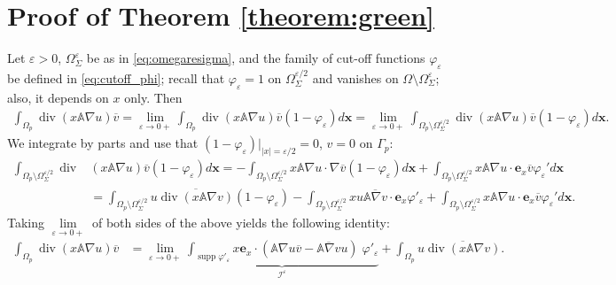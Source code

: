 \documentclass[report]{elsarticle}
\numberwithin{theorem}{section}
\renewcommand{\vec}[1]{\mathbf{#1}}
\newcommand{\re}{\varepsilon}
\begin{document}
\section{Proof of Theorem \ref{theorem:green}}
\label{appendix:green_formula_to_submit}
Let $\re>0$, $
\Omega^{\re}_{\Sigma}$ be as in \eqref{eq:omegaresigma}, 
and the family of cut-off functions $\varphi_{\varepsilon}$ be defined in \eqref{eq:cutoff_phi}; recall that $\varphi_{\re}=1$ on $\Omega^{\re/2}_{\Sigma}$ and vanishes on $\Omega\setminus\Omega^{\re}_{\Sigma}$; also, it depends on $x$ only.   
Then 
	\begin{align*}
		\int_{\Omega_p}\operatorname{div}( x \mathbb{A}\nabla u)\overline{v}=\lim\limits_{\varepsilon\rightarrow 0+}	\int_{\Omega_p}\operatorname{div}( x \mathbb{A}\nabla u)\overline{v}(1-\varphi_{\varepsilon})d\vec{x}
		=\lim\limits_{\varepsilon\rightarrow 0+}	\int_{\Omega_p\setminus \Omega_{\Sigma}^{\varepsilon/2}}\operatorname{div}( x \mathbb{A}\nabla u)\overline{v}(1-\varphi_{\varepsilon})d\vec{x}.
	\end{align*}
We integrate by parts and use that $(1-\varphi_{\varepsilon})|_{|x|=\re/2}=0$, $v=0$ on $\Gamma_p$:
	\begin{align*}
		\int_{\Omega_p\setminus \Omega_{\Sigma}^{\varepsilon/2}}\operatorname{div}&( x \mathbb{A}\nabla u)\overline{v}(1-\varphi_{\varepsilon})d\vec{x}=-\int_{\Omega_p\setminus \Omega_{\Sigma}^{\varepsilon/2}}x\mathbb{A}\nabla u\cdot \nabla \overline{v}(1-\varphi_{\re})d\vec{x}+\int_{\Omega_p\setminus \Omega_{\Sigma}^{\varepsilon/2}}x\mathbb{A}\nabla u\cdot \vec{e}_x \overline{v}\varphi_{\re}'d\vec{x}\\
		&=\int_{\Omega_p\setminus \Omega^{\re/2}_{\Sigma}}
		u\overline{\operatorname{div}(x\mathbb{A}\nabla v)}(1-\varphi_{\re})-\int_{\Omega_p\setminus \Omega^{\re/2}_{\Sigma}}xu\overline{\mathbb{A}\nabla v}\cdot \vec{e}_x\varphi'_{\re}+\int_{\Omega_p\setminus \Omega_{\Sigma}^{\varepsilon/2}}x\mathbb{A}\nabla u\cdot \vec{e}_x \overline{v}\varphi_{\re}'d\vec{x}. 
 	\end{align*}
	Taking $\lim\limits_{\re\rightarrow 0+}$ of both sides of the above yields the following identity:
	\begin{align}
		\int_{\Omega_p}\operatorname{div}( x \mathbb{A}\nabla u)\overline{v}
		&=\lim\limits_{\varepsilon\rightarrow 0+}\underbrace{\int_{\operatorname{supp}\varphi'_{\varepsilon}} x \vec{e}_x\cdot\left(
			{\mathbb{A}\nabla u}\overline{v}-\overline{\mathbb{A}\nabla v}u\right)\; \varphi'_{\varepsilon}}_{\mathcal{I}^{\varepsilon}}
		\label{eq:Iterm}+\int_{\Omega_p}u\overline{\operatorname{div}( x  \mathbb{A}\nabla v)}.
	\end{align}
\end{document}
